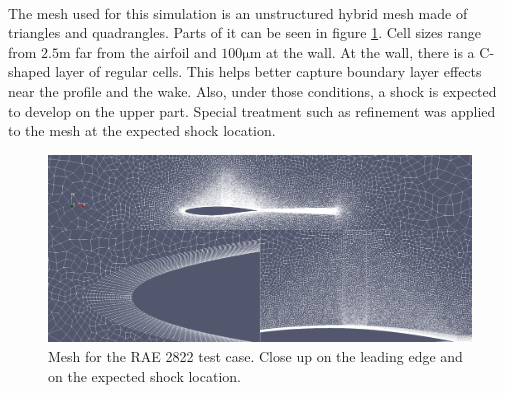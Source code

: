         \paragraph{}
        The mesh used for this simulation is an unstructured hybrid mesh made of triangles and quadrangles.
        Parts of it can be seen in figure \ref{fig:rae_mesh}.
        Cell sizes range from $2.5\si{\meter}$ far from the airfoil and $100\si{\micro\meter}$ at the wall.
        At the wall, there is a C-shaped layer of regular cells.
        This helps better capture boundary layer effects near the profile and the wake.
        Also, under those conditions, a shock is expected to develop on the upper part.
        Special treatment such as refinement was applied to the mesh at the expected shock location.

        \begin{figure}
          \centering
          \includegraphics[width=\textwidth]{figures/rae_mesh.png}
          \caption{Mesh for the RAE 2822 test case. Close up on the leading edge and on the expected shock location.}
          \label{fig:rae_mesh}
        \end{figure}

